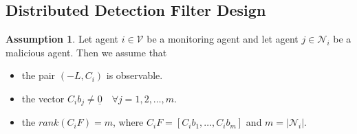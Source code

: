 \documentclass{amsart}
\theoremstyle{definition}
\newtheorem{definition}{Definition}
\newtheorem{ass}{Assumption}
\theoremstyle{remark}
\newtheorem{remark}{Remark}
\numberwithin{equation}{section}
\begin{document}
\subsection{Distributed Detection Filter Design} \label{sec:sec3}




\begin{ass} \label{ass:distEigen} Let agent $i \in \mathcal{V}$ be a monitoring agent and let agent $j \in \mathcal{N}_i$ be a malicious agent. Then we assume that 
\begin{itemize}
	\item the pair $(-L,C_i)$ is observable.
    \item the vector $C_i b_j \neq \underline{0} \quad \forall j = 1,2,\ldots, m$.
    \item the $rank(C_i F) = m$, where $C_i F = \left [C_i b_1, \ldots, C_i b_m \right ]$ and $m=|\mathcal{N}_i|$.
 \end{itemize}
 \end{ass}
 
\end{document}
